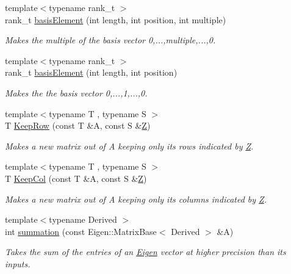 \begin{DoxyCompactItemize}
{\footnotesize template$<$typename rank\+\_\+t $>$ }\\rank\+\_\+t \hyperlink{namespaceMackey_ac2e368bf7d802f2fc47e39a71a5a1630}{basis\+Element} (int length, int position, int multiple)
\begin{DoxyCompactList}\small\item\em Makes the multiple of the basis vector 0,...,multiple,...,0. \end{DoxyCompactList}\item 
{\footnotesize template$<$typename rank\+\_\+t $>$ }\\rank\+\_\+t \hyperlink{namespaceMackey_aa10c6cbea565e024a38b446139800b69}{basis\+Element} (int length, int position)
\begin{DoxyCompactList}\small\item\em Makes the the basis vector 0,...,1,...,0. \end{DoxyCompactList}\item 
{\footnotesize template$<$typename T , typename S $>$ }\\T \hyperlink{namespaceMackey_ad6870101d4fd762100a3115abc4a15db}{Keep\+Row} (const T \&A, const S \&\hyperlink{classZ}{Z})
\begin{DoxyCompactList}\small\item\em Makes a new matrix out of A keeping only its rows indicated by \hyperlink{classZ}{Z}. \end{DoxyCompactList}\item 
{\footnotesize template$<$typename T , typename S $>$ }\\T \hyperlink{namespaceMackey_a9a8496759bc7bb14dcaa2284ae1d0491}{Keep\+Col} (const T \&A, const S \&\hyperlink{classZ}{Z})
\begin{DoxyCompactList}\small\item\em Makes a new matrix out of A keeping only its columns indicated by \hyperlink{classZ}{Z}. \end{DoxyCompactList}\item 
{\footnotesize template$<$typename Derived $>$ }\\int \hyperlink{namespaceMackey_a359aa27a035d2b1f1a3f2f8270fc9e52}{summation} (const Eigen\+::\+Matrix\+Base$<$ Derived $>$ \&A)
\begin{DoxyCompactList}\small\item\em Takes the sum of the entries of an \hyperlink{namespaceEigen}{Eigen} vector at higher precision than its inputs. \end{DoxyCompactList}\item 

\end{DoxyCompactItemize}
